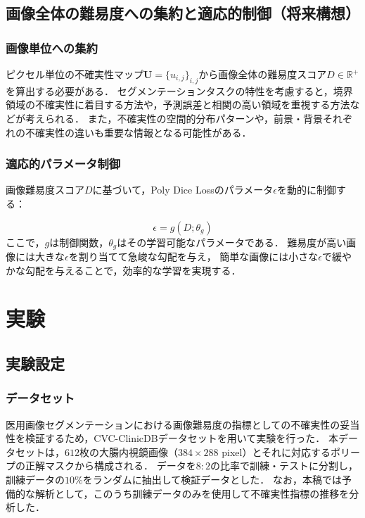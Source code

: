 \documentclass[10pt, a4paper, twocolumn]{jarticle}
\begin{document}
\subsection{画像全体の難易度への集約と適応的制御（将来構想）}

\subsubsection{画像単位への集約}
ピクセル単位の不確実性マップ$\mathbf{U} = \{u_{i,j}\}_{i,j}$から画像全体の難易度スコア$D \in \mathbb{R}^+$を算出する必要がある．
セグメンテーションタスクの特性を考慮すると，境界領域の不確実性に着目する方法や，予測誤差と相関の高い領域を重視する方法などが考えられる．
また，不確実性の空間的分布パターンや，前景・背景それぞれの不確実性の違いも重要な情報となる可能性がある．

\subsubsection{適応的パラメータ制御}
画像難易度スコア$D$に基づいて，Poly Dice Lossのパラメータ$\epsilon$を動的に制御する：

\begin{equation}
  \epsilon = g(D; \theta_g)
\end{equation}
ここで，$g$は制御関数，$\theta_g$はその学習可能なパラメータである．
難易度が高い画像には大きな$\epsilon$を割り当てて急峻な勾配を与え，
簡単な画像には小さな$\epsilon$で緩やかな勾配を与えることで，効率的な学習を実現する．

\section{実験}
\subsection{実験設定}
\subsubsection{データセット}
医用画像セグメンテーションにおける画像難易度の指標としての不確実性の妥当性を検証するため，CVC-ClinicDB\cite{BERNAL201599}データセットを用いて実験を行った．
本データセットは，$612$枚の大腸内視鏡画像（$384 \times 288$ pixel）とそれに対応するポリープの正解マスクから構成される．
データを$8:2$の比率で訓練・テストに分割し，訓練データの$10 \%$をランダムに抽出して検証データとした．
なお，本稿では予備的な解析として，このうち訓練データのみを使用して不確実性指標の推移を分析した．
\end{document}
